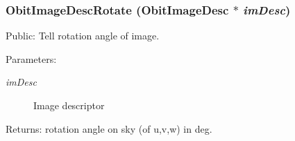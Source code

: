 \subsubsection{ Obit\-Image\-Desc\-Rotate ({\bf Obit\-Image\-Desc} $\ast$ {\em im\-Desc})}\label{ObitImageDesc_8c_a17}


Public: Tell rotation angle of image. 

\begin{Desc}
\item[Parameters:]
\begin{description}
\item[{\em im\-Desc}]Image descriptor \end{description}
\end{Desc}
\begin{Desc}
\item[Returns:]rotation angle on sky (of u,v,w) in deg. \end{Desc}
